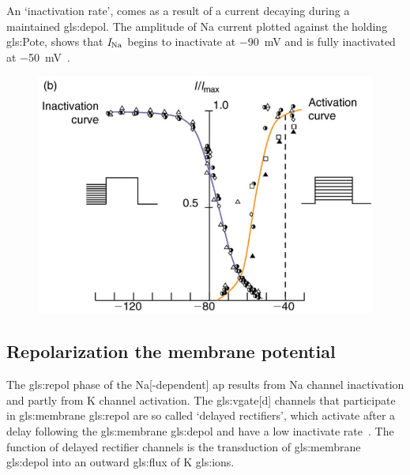 \documentclass[class={myRUCProject}, crop=false]{standalone}
\begin{document}
An `inactivation rate', comes as a result of a current decaying during a maintained \gls{gls:depol}. 
The amplitude of \gls{Na} current plotted against the holding \gls{gls:Pote}, shows that \(\mathit{I}_\mathrm{Na}\) begins to inactivate at \qty{-90}{\mV} and is fully inactivated at \qty{-50}{\mV}~\cite{Hammond2015ch4}. 
\begin{figure}[H]
  \centering
  \includegraphics[width=0.5\linewidth]{Pictures//Anakin/activ-inactiv.png}
  \caption{}\label{fig:actinact}
\end{figure}

\subsection{Repolarization the membrane potential}

The \gls{gls:repol} phase of the \gls{Na}[-dependent] \gls{ap} results from \gls{Na} channel inactivation and partly from \gls{K} channel activation. The \gls{gls:vgate}[d] channels that participate in \gls{gls:membrane} \gls{gls:repol} are so called `delayed rectifiers', which activate after a delay following the \gls{gls:membrane} \gls{gls:depol} and have a low inactivate rate~\cite{Hammond2015ch4}. The function of delayed rectifier channels is the transduction of \gls{gls:membrane} \gls{gls:depol} into an outward \gls{gls:flux} of \gls{K} \glspl{gls:ion}. 
\end{document}
